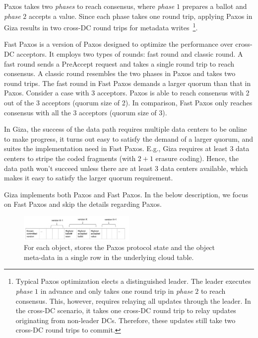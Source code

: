 Paxos takes two {\em phases} to reach consensus, where {\em phase} $1$ prepares a ballot and {\em phase} $2$ accepts a value. Since each phase takes one round trip, applying Paxos in Giza results in two cross-DC round trips for metadata writes~\footnote{Typical Paxos optimization elects a distinguished leader. The leader executes {\em phase} $1$ in advance and only takes one round trip in {\em phase} $2$ to reach consensus. This, however, requires relaying all updates through the leader. In the cross-DC scenario, it takes one cross-DC round trip to relay updates originating from non-leader DCs. Therefore, these updates still take two cross-DC round trips to commit.}.

Fast Paxos is a version of Paxos designed to optimize the performance over cross-DC acceptors. It employs two types of rounds: fast round and classic round. A fast round sends a PreAccept request and takes a single round trip to reach consensus. A classic round resembles the two phases in Paxos and takes two round trips.
The fast round in Fast Paxos demands a larger quorum than that in Paxos. Consider a case with $3$ acceptors. Paxos is able to reach consensus with 2 out of the 3 acceptors (quorum size of 2). In comparison, Fast Paxos only reaches consensus with all the 3 acceptors (quorum size of 3).

In Giza, the success of the data path requires multiple data centers to be online to make progress, it turns out easy to satisfy the demand of a larger quorum, and suites the implementation need in Fast Paxos. E.g., Giza requires at least 3 data centers to stripe the coded fragments (with $2 + 1$ erasure coding). Hence, the data path won't succeed unless there are at least 3 data centers available, which makes it easy to satisfy the larger quorum requirement.

Giza implements both Paxos and Fast Paxos. In the below description, we focus on Fast Paxos and skip the details regarding Paxos.

\begin{figure}[tp]
\centering
\includegraphics[width=0.5\textwidth]{fig/Giza_Metadata}
\caption{For each object, \name stores the Paxos protocol state and the object meta-data 
in a single row in the underlying cloud table.\label{fig:metadata}}
\end{figure}

